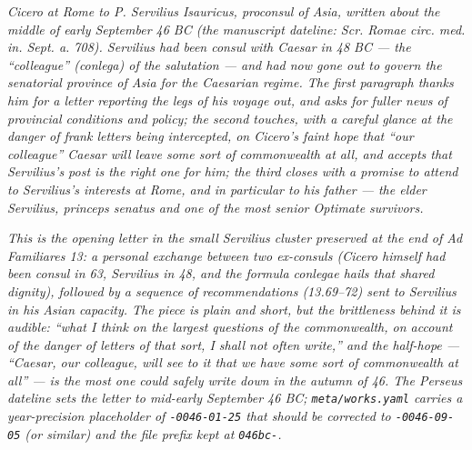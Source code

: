 
\textit{Cicero at Rome to P. Servilius Isauricus, proconsul of
Asia, written about the middle of early September 46 BC (the
manuscript dateline: \textit{Scr. Romae circ. med. in. Sept. a.
708}). Servilius had been consul with Caesar in 48 BC --- the
``colleague'' (\textit{conlega}) of the salutation --- and had now
gone out to govern the senatorial province of Asia for the
Caesarian regime. The first paragraph thanks him for a letter
reporting the legs of his voyage out, and asks for fuller news of
provincial conditions and policy; the second touches, with a
careful glance at the danger of frank letters being intercepted,
on Cicero's faint hope that ``our colleague'' Caesar will leave
some sort of commonwealth at all, and accepts that Servilius's
post is the right one for him; the third closes with a promise
to attend to Servilius's interests at Rome, and in particular to
his father --- the elder Servilius, princeps senatus and one of
the most senior Optimate survivors.}

\textit{This is the opening letter in the small Servilius cluster
preserved at the end of \textit{Ad Familiares} 13: a personal
exchange between two ex-consuls (Cicero himself had been consul
in 63, Servilius in 48, and the formula \textit{conlegae} hails
that shared dignity), followed by a sequence of recommendations
(13.69--72) sent to Servilius in his Asian capacity. The piece is
plain and short, but the brittleness behind it is audible: ``what
I think on the largest questions of the commonwealth, on account
of the danger of letters of that sort, I shall not often write,''
and the half-hope --- ``Caesar, our colleague, will see to it that
we have some sort of commonwealth at all'' --- is the most one
could safely write down in the autumn of 46. The Perseus dateline
sets the letter to mid-early September 46 BC; \texttt{meta/works.yaml}
carries a year-precision placeholder of \texttt{-0046-01-25} that
should be corrected to \texttt{-0046-09-05} (or similar) and the
file prefix kept at \texttt{046bc-}.}

